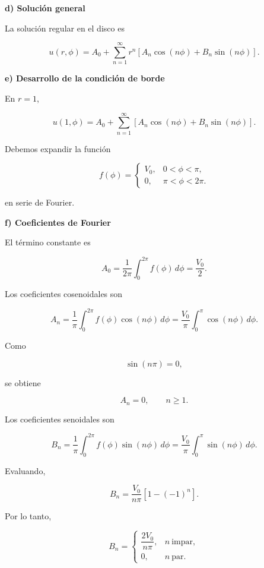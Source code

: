 \documentclass[11pt,spanish]{article}
\begin{document}

{\bf d) Solución general}

La solución regular en el disco es

\[
u(r,\phi)
=
A_0
+
\sum_{n=1}^{\infty}
r^n
\left[
A_n\cos(n\phi)
+
B_n\sin(n\phi)
\right].
\]


{\bf e) Desarrollo de la condición de borde}

En \(r=1\),

\[
u(1,\phi)
=
A_0
+
\sum_{n=1}^{\infty}
\left[
A_n\cos(n\phi)
+
B_n\sin(n\phi)
\right].
\]

Debemos expandir la función

\[
f(\phi)=
\begin{cases}
V_0,&0<\phi<\pi,\\
0,&\pi<\phi<2\pi.
\end{cases}
\]

en serie de Fourier.


{\bf f) Coeficientes de Fourier}

El término constante es

\[
A_0
=
\frac1{2\pi}
\int_0^{2\pi}
f(\phi)\,d\phi
=
\frac{V_0}{2}.
\]

Los coeficientes cosenoidales son

\[
A_n
=
\frac1\pi
\int_0^{2\pi}
f(\phi)\cos(n\phi)\,d\phi
=
\frac{V_0}{\pi}
\int_0^\pi
\cos(n\phi)\,d\phi.
\]

Como

\[
\sin(n\pi)=0,
\]

se obtiene

\[
A_n=0,
\qquad
n\ge1.
\]

Los coeficientes senoidales son

\[
B_n
=
\frac1\pi
\int_0^{2\pi}
f(\phi)\sin(n\phi)\,d\phi
=
\frac{V_0}{\pi}
\int_0^\pi
\sin(n\phi)\,d\phi.
\]

Evaluando,

\[
B_n
=
\frac{V_0}{n\pi}
\left[
1-(-1)^n
\right].
\]

Por lo tanto,

\[
B_n=
\begin{cases}
\dfrac{2V_0}{n\pi},
&
n\ \text{impar},
\\[2ex]
0,
&
n\ \text{par}.
\end{cases}
\]
\end{document}
